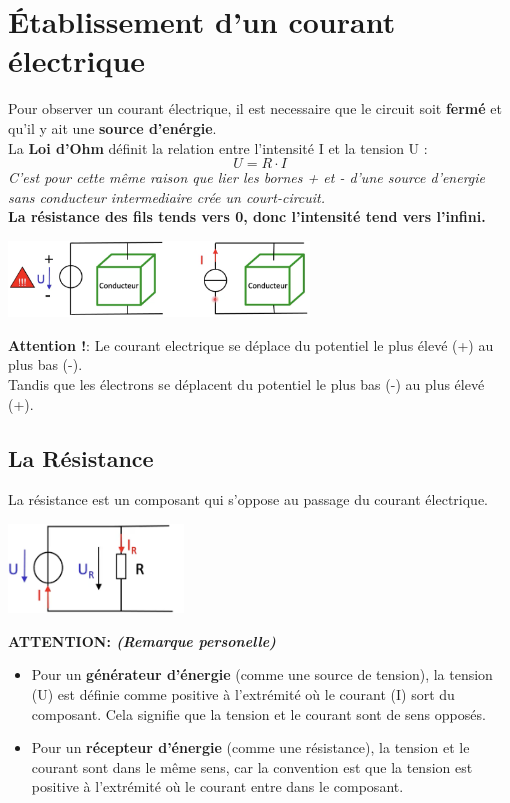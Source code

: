 \section{Établissement d'un courant électrique}
Pour observer un courant électrique, il est necessaire que le circuit soit \textbf{fermé} et qu'il y ait une \textbf{source d'enérgie}. \\
La \textbf{Loi d'Ohm} définit la relation entre l'intensité I et la tension U :
\begin{equation}
    U = R \cdot I
\end{equation}
\textit{C'est pour cette même raison que lier les bornes + et - d'une source d'energie sans conducteur intermediaire crée un court-circuit.} \\
\textbf{La résistance des fils tends vers 0, donc l'intensité tend vers l'infini.}
\begin{center}
    \includegraphics[width=0.6\textwidth]{chapters/chapter1/images/courant.png}
\end{center}
\textbf{Attention !}: Le courant electrique se déplace du potentiel le plus élevé (+) au plus bas (-). \\ 
Tandis que les électrons se déplacent du potentiel le plus bas (-) au plus élevé (+).

\subsection{La Résistance}
La résistance est un composant qui s'oppose au passage du courant électrique. \\
\begin{center}
    \includegraphics[width=0.35\textwidth]{chapters/chapter1/images/resistance.png}
\end{center}
\textbf{ATTENTION: \textit{(Remarque personelle)}} \\
\begin{itemize}
    \item Pour un \textbf{générateur d'énergie} (comme une source de tension), la tension (U) est définie comme positive à l'extrémité où le courant (I) sort du composant. Cela signifie que la tension et le courant sont de sens opposés.
    \item Pour un \textbf{récepteur d'énergie} (comme une résistance), la tension et le courant sont dans le même sens, car la convention est que la tension est positive à l'extrémité où le courant entre dans le composant.
\end{itemize}
